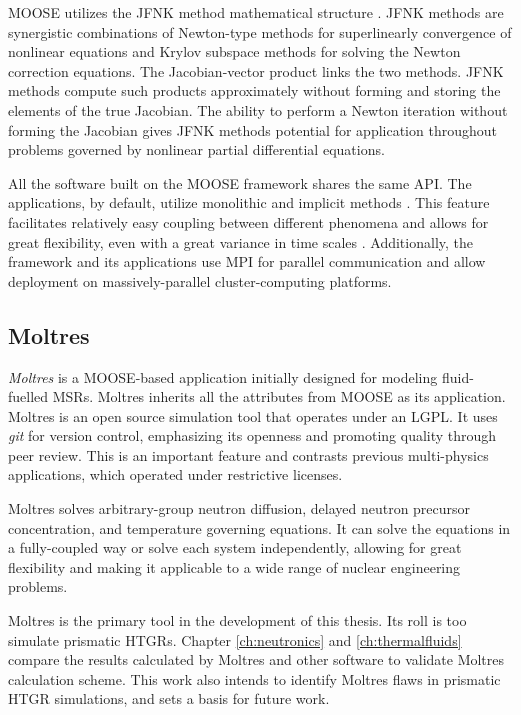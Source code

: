 \gls{MOOSE} utilizes the \gls{JFNK} method \cite{knoll_jacobian-free_2004} mathematical structure \cite{gaston_moose_2009}.
\gls{JFNK} methods are synergistic combinations of Newton-type methods for superlinearly convergence of nonlinear equations and Krylov subspace methods for solving the Newton correction equations.
The Jacobian-vector product links the two methods.
JFNK methods compute such products approximately without forming and storing the elements of the true Jacobian.
The ability to perform a Newton iteration without forming the Jacobian gives JFNK methods potential for application throughout problems governed by nonlinear partial differential equations.

All the software built on the MOOSE framework shares the same \gls{API}.
The applications, by default, utilize monolithic and implicit methods \cite{lindsay_introduction_2018}.
This feature facilitates relatively easy coupling between different phenomena and allows for great flexibility, even with a great variance in time scales \cite{novak_pronghorn_2018}.
Additionally, the framework and its applications use \gls{MPI} for parallel communication and allow deployment on massively-parallel cluster-computing platforms.

\subsection{Moltres}
\label{sec:ch3-moltres}

\textit{Moltres} is a MOOSE-based application initially designed for modeling fluid-fuelled \glspl{MSR}.
Moltres inherits all the attributes from MOOSE as its application.
Moltres is an open source simulation tool that operates under an LGPL.
It uses \textit{git} for version control, emphasizing its openness and promoting quality through peer review.
This is an important feature and contrasts previous multi-physics applications, which operated under restrictive licenses.

Moltres solves arbitrary-group neutron diffusion, delayed neutron precursor concentration, and temperature governing equations.
It can solve the equations in a fully-coupled way or solve each system independently, allowing for great flexibility and making it applicable to a wide range of nuclear engineering problems.

Moltres is the primary tool in the development of this thesis.
Its roll is too simulate prismatic HTGRs.
Chapter \ref{ch:neutronics} and \ref{ch:thermalfluids} compare the results calculated by Moltres and other software to validate Moltres calculation scheme.
This work also intends to identify Moltres flaws in prismatic HTGR simulations, and sets a basis for future work.

